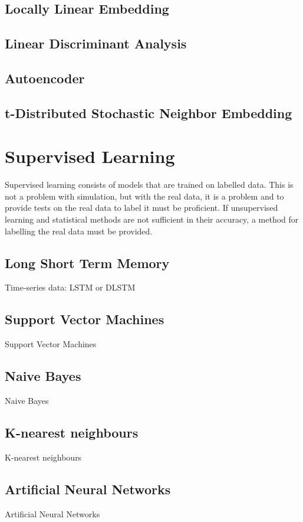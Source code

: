 \subsection{Locally Linear Embedding}
\subsection{Linear Discriminant Analysis}
\subsection{Autoencoder}
\subsection{t-Distributed Stochastic Neighbor Embedding}

\section{Supervised Learning}
Supervised learning consists of models that are trained on labelled data. This is not a problem with simulation, but with the real data, it is a problem and to provide tests on the real data to label it must be proficient. If unsupervised learning and statistical methods are not sufficient in their accuracy, a method for labelling the real data must be provided.

\subsection{Long Short Term Memory}
Time-series data: LSTM or DLSTM

\subsection{Support Vector Machines}
Support Vector Machines

\subsection{Naive Bayes}
Naive Bayes

\subsection{K-nearest neighbours}
K-nearest neighbours

\subsection{Artificial Neural Networks}
Artificial Neural Networks

